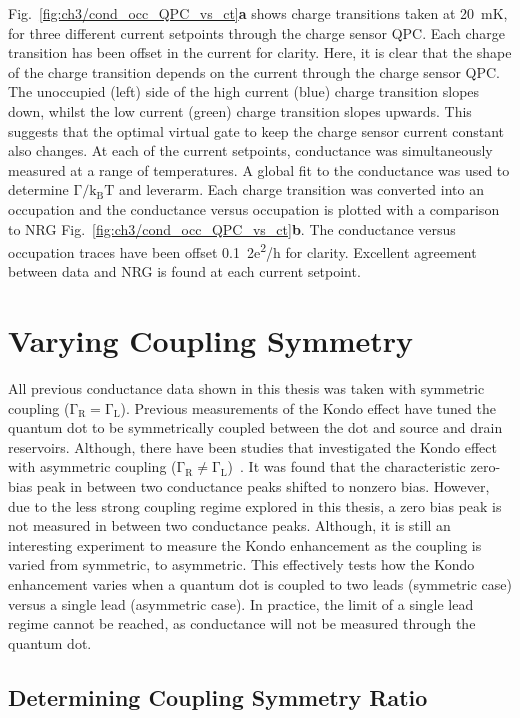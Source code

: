 Fig.~\ref{fig:ch3/cond_occ_QPC_vs_ct}\textbf{a} shows charge transitions taken at \qty{20}{mK}, for three different current setpoints through the charge sensor QPC. Each charge transition has been offset in the current for clarity. Here, it is clear that the shape of the charge transition depends on the current through the charge sensor QPC. The unoccupied (left) side of the high current (blue) charge transition slopes down, whilst the low current (green) charge transition slopes upwards. This suggests that the optimal virtual gate to keep the charge sensor current constant also changes. At each of the current setpoints, conductance was simultaneously measured at a range of temperatures. A global fit to the conductance was used to determine $\mathrm{\Gamma/k_BT}$ and leverarm. Each charge transition was converted into an occupation and the conductance versus occupation is plotted with a comparison to NRG Fig.~\ref{fig:ch3/cond_occ_QPC_vs_ct}\textbf{b}. The conductance versus occupation traces have been offset \qty{0.1}{2e^2/h} for clarity. Excellent agreement between data and NRG is found at each current setpoint. 


\section{Varying Coupling Symmetry}

All previous conductance data shown in this thesis was taken with symmetric coupling ($\mathrm{\Gamma_R = \Gamma_L}$). Previous measurements of the Kondo effect have tuned the quantum dot to be symmetrically coupled between the dot and source and drain reservoirs. Although, there have been studies that investigated the Kondo effect with asymmetric coupling ($\mathrm{\Gamma_R \neq \Gamma_L}$)~\cite{kondo_asymmetric}. It was found that the characteristic zero-bias peak in between two conductance peaks shifted to nonzero bias. However, due to the less strong coupling regime explored in this thesis, a zero bias peak is not measured in between two conductance peaks. Although, it is still an interesting experiment to measure the Kondo enhancement as the coupling is varied from symmetric, to asymmetric. This effectively tests how the Kondo enhancement varies when a quantum dot is coupled to two leads (symmetric case) versus a single lead (asymmetric case). In practice, the limit of a single lead regime cannot be reached, as conductance will not be measured through the quantum dot.


\subsection{Determining Coupling Symmetry Ratio}


